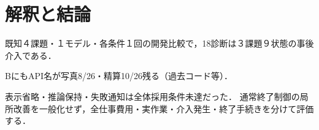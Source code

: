 \documentclass[uplatex,a4paper,twocolumn,10pt]{jsarticle}
\begin{document}



\section{解釈と結論}
既知４課題・１モデル・各条件１回の開発比較で，18診断は３課題９状態の事後介入である．

BにもAPI名が写真8/26・精算10/26残る（過去コード等）．

表示省略・推論保持・失敗通知は全体採用条件未達だった．
通常終了制御の局所改善を一般化せず，全仕事費用・実作業・介入発生・終了手続きを分けて評価する．



\end{document}
